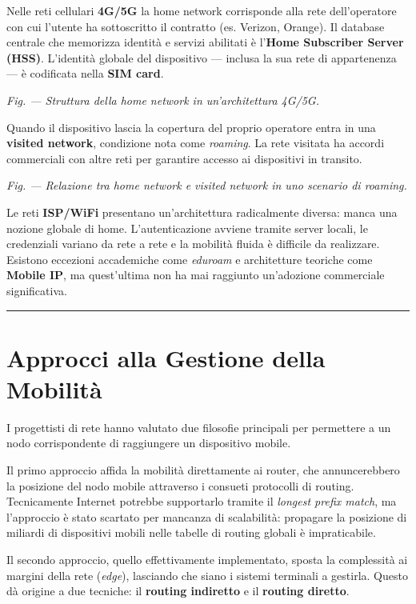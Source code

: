 \documentclass[
  italian,
  openany]{book}
\begin{document}
Nelle reti cellulari \textbf{4G/5G} la home network corrisponde alla
rete dell'operatore con cui l'utente ha sottoscritto il contratto (es.
Verizon, Orange). Il database centrale che memorizza identità e servizi
abilitati è l'\textbf{Home Subscriber Server (HSS)}. L'identità globale
del dispositivo --- inclusa la sua rete di appartenenza --- è codificata
nella \textbf{SIM card}.

\emph{Fig. --- Struttura della home network in un'architettura 4G/5G.}

Quando il dispositivo lascia la copertura del proprio operatore entra in
una \textbf{visited network}, condizione nota come \emph{roaming}. La
rete visitata ha accordi commerciali con altre reti per garantire
accesso ai dispositivi in transito.

\emph{Fig. --- Relazione tra home network e visited network in uno
scenario di roaming.}

Le reti \textbf{ISP/WiFi} presentano un'architettura radicalmente
diversa: manca una nozione globale di home. L'autenticazione avviene
tramite server locali, le credenziali variano da rete a rete e la
mobilità fluida è difficile da realizzare. Esistono eccezioni
accademiche come \emph{eduroam} e architetture teoriche come
\textbf{Mobile IP}, ma quest'ultima non ha mai raggiunto un'adozione
commerciale significativa.

\begin{center}\rule{0.5\linewidth}{0.5pt}\end{center}

\section{Approcci alla Gestione della
Mobilità}\label{approcci-alla-gestione-della-mobilituxe0}

I progettisti di rete hanno valutato due filosofie principali per
permettere a un nodo corrispondente di raggiungere un dispositivo
mobile.

Il primo approccio affida la mobilità direttamente ai router, che
annuncerebbero la posizione del nodo mobile attraverso i consueti
protocolli di routing. Tecnicamente Internet potrebbe supportarlo
tramite il \emph{longest prefix match}, ma l'approccio è stato scartato
per mancanza di scalabilità: propagare la posizione di miliardi di
dispositivi mobili nelle tabelle di routing globali è impraticabile.

Il secondo approccio, quello effettivamente implementato, sposta la
complessità ai margini della rete (\emph{edge}), lasciando che siano i
sistemi terminali a gestirla. Questo dà origine a due tecniche: il
\textbf{routing indiretto} e il \textbf{routing diretto}.
\end{document}
